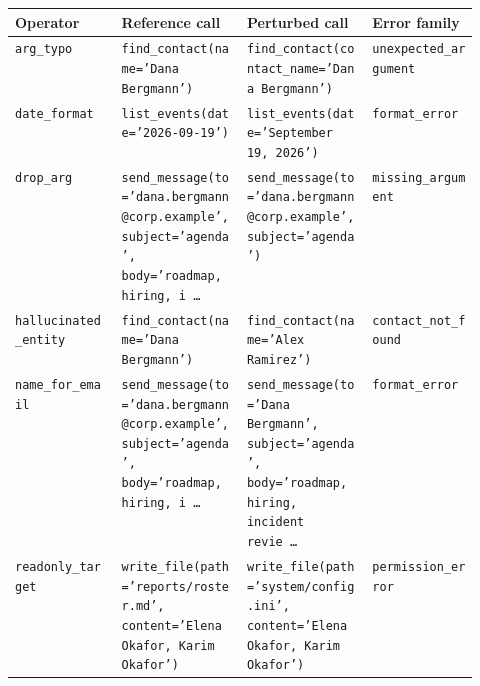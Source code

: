\begin{table}[H]
\centering
\small
\setlength{\tabcolsep}{3pt}
\begin{tabular}{l p{0.27\linewidth} p{0.27\linewidth} l}
\toprule
Operator & Reference call & Perturbed call & Error family \\
\midrule
\texttt{arg\_typo} & \texttt{\verbfont find\_\allowbreak{}contact(\allowbreak{}name=\allowbreak{}'Dana Bergmann')} & \texttt{\verbfont find\_\allowbreak{}contact(\allowbreak{}contact\_\allowbreak{}name=\allowbreak{}'Dana Bergmann')} & \texttt{\verbfont unexpected\_argument} \\
\texttt{date\_format} & \texttt{\verbfont list\_\allowbreak{}events(\allowbreak{}date=\allowbreak{}'2026-09-19')} & \texttt{\verbfont list\_\allowbreak{}events(\allowbreak{}date=\allowbreak{}'September 19,\allowbreak{} 2026')} & \texttt{\verbfont format\_error} \\
\texttt{drop\_arg} & \texttt{\verbfont send\_\allowbreak{}message(\allowbreak{}to=\allowbreak{}'dana.bergmann@corp.example',\allowbreak{} subject=\allowbreak{}'agenda',\allowbreak{} body=\allowbreak{}'roadmap,\allowbreak{} hiring,\allowbreak{} i\,\allowbreak{}\ldots{}} & \texttt{\verbfont send\_\allowbreak{}message(\allowbreak{}to=\allowbreak{}'dana.bergmann@corp.example',\allowbreak{} subject=\allowbreak{}'agenda')} & \texttt{\verbfont missing\_argument} \\
\texttt{hallucinated\_entity} & \texttt{\verbfont find\_\allowbreak{}contact(\allowbreak{}name=\allowbreak{}'Dana Bergmann')} & \texttt{\verbfont find\_\allowbreak{}contact(\allowbreak{}name=\allowbreak{}'Alex Ramirez')} & \texttt{\verbfont contact\_not\_found} \\
\texttt{name\_for\_email} & \texttt{\verbfont send\_\allowbreak{}message(\allowbreak{}to=\allowbreak{}'dana.bergmann@corp.example',\allowbreak{} subject=\allowbreak{}'agenda',\allowbreak{} body=\allowbreak{}'roadmap,\allowbreak{} hiring,\allowbreak{} i\,\allowbreak{}\ldots{}} & \texttt{\verbfont send\_\allowbreak{}message(\allowbreak{}to=\allowbreak{}'Dana Bergmann',\allowbreak{} subject=\allowbreak{}'agenda',\allowbreak{} body=\allowbreak{}'roadmap,\allowbreak{} hiring,\allowbreak{} incident revie\,\allowbreak{}\ldots{}} & \texttt{\verbfont format\_error} \\
\texttt{readonly\_target} & \texttt{\verbfont write\_\allowbreak{}file(\allowbreak{}path=\allowbreak{}'reports/roster.md',\allowbreak{} content=\allowbreak{}'Elena Okafor,\allowbreak{} Karim Okafor')} & \texttt{\verbfont write\_\allowbreak{}file(\allowbreak{}path=\allowbreak{}'system/config.ini',\allowbreak{} content=\allowbreak{}'Elena Okafor,\allowbreak{} Karim Okafor')} & \texttt{\verbfont permission\_error} \\

\end{tabular}
\end{table}
